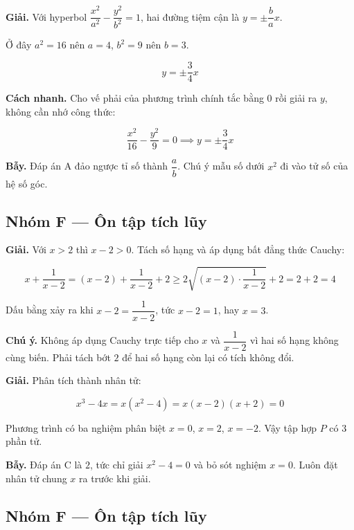 \documentclass[11pt, a4paper]{article}
\begin{document}
\begin{dapan}[23 — Đáp án B]
\textbf{Giải.} Với hyperbol $\dfrac{x^2}{a^2} - \dfrac{y^2}{b^2} = 1$, hai đường tiệm cận là $y = \pm\dfrac{b}{a}x$.

Ở đây $a^2 = 16$ nên $a = 4$, $b^2 = 9$ nên $b = 3$.

$$y = \pm\frac{3}{4}x$$

\textbf{Cách nhanh.} Cho vế phải của phương trình chính tắc bằng $0$ rồi giải ra $y$, không cần nhớ công thức:

$$\frac{x^2}{16} - \frac{y^2}{9} = 0 \implies y = \pm\frac{3}{4}x$$

\textbf{Bẫy.} Đáp án A đảo ngược tỉ số thành $\dfrac{a}{b}$. Chú ý mẫu số dưới $x^2$ đi vào tử số của hệ số góc.
\end{dapan}

\subsection*{Nhóm F — Ôn tập tích lũy}

\begin{dapan}[24 — Đáp án C]
\textbf{Giải.} Với $x > 2$ thì $x - 2 > 0$. Tách số hạng và áp dụng bất đẳng thức Cauchy:

$$x + \frac{1}{x-2} = (x-2) + \frac{1}{x-2} + 2 \ge 2\sqrt{(x-2) \cdot \frac{1}{x-2}} + 2 = 2 + 2 = 4$$

Dấu bằng xảy ra khi $x - 2 = \dfrac{1}{x-2}$, tức $x - 2 = 1$, hay $x = 3$.

\textbf{Chú ý.} Không áp dụng Cauchy trực tiếp cho $x$ và $\dfrac{1}{x-2}$ vì hai số hạng không cùng biến. Phải tách bớt $2$ để hai số hạng còn lại có tích không đổi.
\end{dapan}

\begin{dapan}[25 — Đáp án D]
\textbf{Giải.} Phân tích thành nhân tử:

$$x^3 - 4x = x(x^2 - 4) = x(x-2)(x+2) = 0$$

Phương trình có ba nghiệm phân biệt $x = 0$, $x = 2$, $x = -2$. Vậy tập hợp $P$ có $3$ phần tử.

\textbf{Bẫy.} Đáp án C là $2$, tức chỉ giải $x^2 - 4 = 0$ và bỏ sót nghiệm $x = 0$. Luôn đặt nhân tử chung $x$ ra trước khi giải.
\end{dapan}

\subsection*{Nhóm F — Ôn tập tích lũy}
\end{document}
